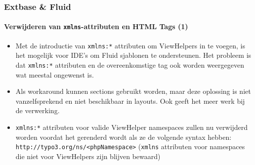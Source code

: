 \begin{frame}[fragile]
	\frametitle{Extbase \& Fluid}
	\framesubtitle{Verwijderen van \texttt{xmlns}-attributen en HTML Tags (1)}

	\lstset{basicstyle=\tiny\ttfamily}

	\begin{itemize}

		\item Met de introductie van \texttt{xmlns:*} attributen om
			ViewHelpers in te voegen, is het mogelijk voor IDE's om Fluid sjablonen te ondersteunen.
			Het probleem is dat \texttt{xmlns:*} attributen en de overeenkomstige tag
			ook worden weergegeven wat meestal ongewenst is.

		\item Als workaround kunnen sections gebruikt worden, maar deze oplossing is niet vanzelfsprekend
			en niet beschikbaar in layouts. Ook geeft het meer werk bij de verwerking.

		\item \texttt{xmlns:*} attributen voor valide ViewHelper namespaces zullen nu verwijderd worden
			voordat het gerenderd wordt als ze de volgende syntax hebben:
			\small\texttt{http://typo3.org/ns/<phpNamespace>}\normalsize\newline
			(\texttt{xmlns} attributen voor namespaces die niet voor ViewHelpers zijn blijven bewaard)

	\end{itemize}

\end{frame}


